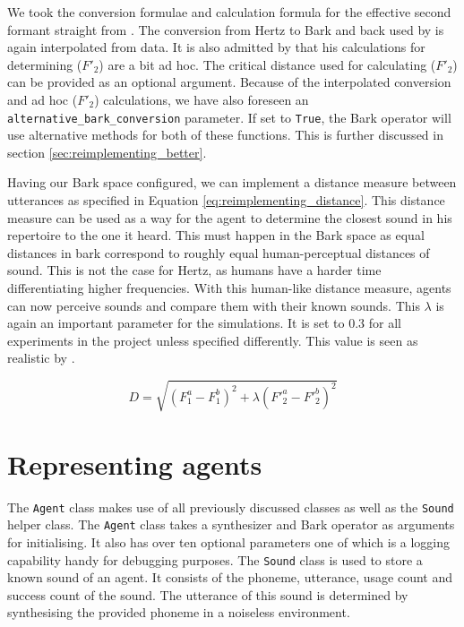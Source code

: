 We took the conversion formulae and calculation formula for the effective second formant straight from \citet{deBoer2000}.
The conversion from Hertz to Bark and back used by \citet{deBoer2000} is again interpolated from data.
It is also admitted by \citet{deBoer2000} that his calculations for determining ($F'_2$) are a bit ad hoc.
The critical distance used for calculating ($F'_2$) can be provided as an optional argument.
Because of the interpolated conversion and ad hoc ($F'_2$) calculations, we have also foreseen an \texttt{alternative\_bark\_conversion} parameter.
If set to \texttt{True}, the Bark operator will use alternative methods for both of these functions.
This is further discussed in section \ref{sec:reimplementing_better}.

Having our Bark space configured, we can implement a distance measure between utterances as specified in Equation \ref{eq:reimplementing_distance}.
This distance measure can be used as a way for the agent to determine the closest sound in his repertoire to the one it heard.
This must happen in the Bark space as equal distances in bark correspond to roughly equal human-perceptual distances of sound.
This is not the case for Hertz, as humans have a harder time differentiating higher frequencies.
With this human-like distance measure, agents can now perceive sounds and compare them with their known sounds.
This $\lambda$ is again an important parameter for the simulations.
It is set to $0.3$ for all experiments in the project unless specified differently.
This value is seen as realistic by \citet{Schwartz1997, deBoer2000, vallee1994, 1985book}.

\begin{equation}
D = \sqrt{ ( F^a_1 - F^b_1 ) ^2 + \lambda ( F'^a_2 - F'^b_2 )^2 }
\label{eq:reimplementing_distance}
\end{equation}

\section{Representing agents}
\label{sec:reimplementing_agents}

The \texttt{Agent} class makes use of all previously discussed classes as well as the \texttt{Sound} helper class.
The \texttt{Agent} class takes a synthesizer and Bark operator as arguments for initialising.
It also has over ten optional parameters one of which is a logging capability handy for debugging purposes.
The \texttt{Sound} class is used to store a known sound of an agent.
It consists of the phoneme, utterance, usage count and success count of the sound.
The utterance of this sound is determined by synthesising the provided phoneme in a noiseless environment.


